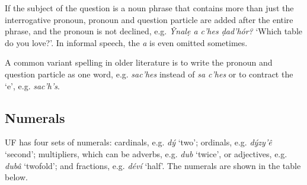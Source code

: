 \documentclass[a4paper, 12pt, twoside, final]{article}
\let \w \textit
\begin{document}
If the subject of the question is a noun phrase that contains more than just the interrogative pronoun,
pronoun and question particle are added after the entire phrase, and the pronoun is not declined, e.g.
\w{Ŷnalẹ a c’hes ḍad’hór?} ‘Which table do you love?’. In informal speech, the \w{a} is even omitted
sometimes.

A common variant spelling in older literature is to write the pronoun and question particle as one
word, e.g. \w{sac’hes} instead of \w{sa c’hes} or to contract the ‘e’, e.g. \w{sac’h’s}.

\subsection{Numerals}\label{subsec:numerals}
UF has four sets of numerals: cardinals, e.g. \w{dý} ‘two’; ordinals, e.g. \w{dýzy’ê} ‘second’; multipliers, which can
be adverbs, e.g. \w{dub} ‘twice’, or adjectives, e.g. \w{dubâ} ‘twofold’; and fractions, e.g. \w{déví} ‘half’. The numerals
are shown in the table below.
\end{document}
